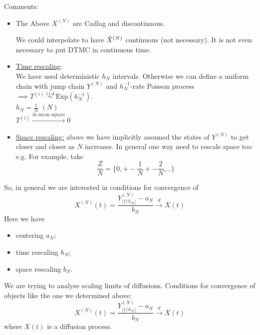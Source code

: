 \documentclass{article}
\begin{document}
Comments:
\begin{itemize}
	\item The Above $X^{(N)}$ are Cadlag and discontinuous.\\
	\begin{figure}[H]
		\centering
		
	\end{figure}
	
	We could interpolate to have $\Tilde{X}^{(N)}$ continuous (not necessary).
	It is not even necessary to put DTMC in continuous time. \\
	\item \underline{Time rescaling}: \\
	We have used deterministic $h_N$ intervals. Otherwise we can define a uniform chain with jump chain $Y^{(N)}$ and $h_N^{-1}$-rate Poisson process $\implies T^{(i)} \stackrel{\text{ i.i.d.}}\sim \text{Exp}(h_N^{-1})$.  \\
	
	$h_N = \frac{1}{N}$  $(N)$\\
	$T^{(i)} \xrightarrow{\text{in mean square}} 0$
	\item \underline{Space rescaling:} above we have implicitly assumed the states of $Y^{(N)}$ to get closer and closer as $N$ increases. 
	In general one way need to rescale space too e.g.
	For example, take 
	$$\frac{Z}{N}=\{0,+-\frac{1}{N}+-\frac{2}{N},..\}$$
\end{itemize}
So, in general we are interested in conditions for convergence of 
\begin{equation*}
	X^{(N)}(t) = \frac{Y^{(N)}_{\lfloor t/h_N \rfloor} - a_N}{b_N} \xrightarrow{d} X(t)
\end{equation*}
Here we have
\begin{itemize}
	\item centering $a_N$;
	\item time rescaling $h_N$;
	\item space rescaling $b_N$.
\end{itemize}

We are trying to analyse scaling limits of diffusions. 
Conditions for convergence of objects like the one we determined above:
\begin{equation*}
	X^{(N)}(t) = \frac{Y^{(N)}_{\lfloor t/h_N \rfloor} - a_N}{b_N} \xrightarrow{d} X(t)
\end{equation*}
where $X(t)$ is a diffusion process.\\
\end{document}
